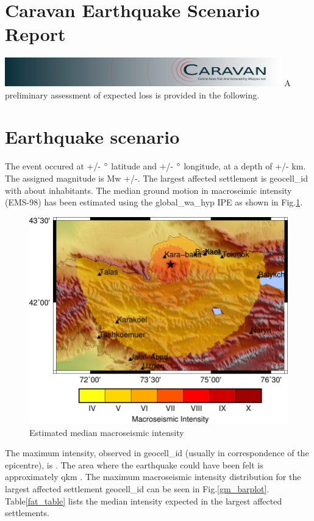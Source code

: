 \documentclass{article}
\begin{document}
\section*{Caravan Earthquake Scenario Report}
\includegraphics[width=12cm]{../imgs/banner0.png}
A preliminary assessment of expected loss is provided in the following.
\section*{Earthquake scenario}
The event occured at +/{-} $\degree$ latitude 
and +/{-} $\degree$ longitude, 
at a depth of +/{-} km. 
The assigned magnitude is Mw +/{-}. 
The largest affected settlement is geocell\_id  with about  inhabitants. The median ground motion in macroseimic intensity (EMS{-}98) has been estimated using the global\_wa\_hyp IPE as shown in Fig.\ref{gm_fig}.


\begin{figure}[h!]
\centering
\includegraphics[width=12cm]{gm.pdf}
\caption{Estimated median macroseismic intensity}
\label{gm_fig}
\end{figure}


The maximum intensity, observed in geocell\_id  (usually in correspondence of the epicentre), is . The area where the earthquake could have been felt is approximately  qkm .
The maximum macroseismic intensity distribution for the largest affected settlement geocell\_id  can be seen in Fig.\ref{gm_barplot}. 
Table\ref{fat_table} lists the median intensity expected in the  largest affected settlements.
\end{document}
